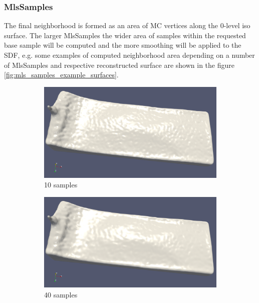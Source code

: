 \subsubsection{MlsSamples}
The final neighborhood is formed as an area of MC vertices along the 0-level iso surface. The larger MlsSamples the wider area of samples within the requested base sample will be computed and the more smoothing will be applied to the SDF, e.g. some examples of computed neighborhood area depending on a number of MlsSamples and respective reconstructed surface are shown in the figure \ref{fig:mls_samples_example_surfaces}.
\begin{figure}[H]
	\begin{center}
		\begin{subfigure}[b]{0.49\textwidth}
			\includegraphics[width=\textwidth]{figures/MlsSamples10.png}
			\caption{10 samples}
		\end{subfigure}
		\begin{subfigure}[b]{0.49\textwidth}
			\includegraphics[width=\textwidth]{figures/MlsSamples40.png}
			\caption{40 samples}
		\end{subfigure}
		\begin{subfigure}[b]{0.49\textwidth}

\end{subfigure}
\end{center}
\end{figure}
